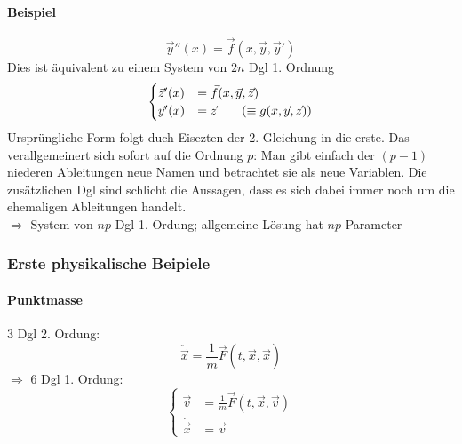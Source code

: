 \documentclass[a4paper]{scrartcl}
\newcommand{\f}[2]{\frac{#1}{#2}}
\renewcommand{\v}[1]{\vec{#1}}
\theoremstyle{definition}
\theoremstyle{plain}
\theoremstyle{remark}
\begin{document}
\paragraph{Beispiel}
\label{sec-3-3-8-2}
\[\v{y}''(x) = \v{f}(x,\v{y},\v{y}')\]
Dies ist äquivalent zu einem System von $2n$ Dgl 1. Ordnung
\begin{equation}
\begin{cases}
\v{z}'(x) &= \v{f}(x,\v{y},\v{z}) \\
\v{y}'(x) &= \v z \tag{$\equiv g(x,\v y, \v z)$}
\end{cases}
\end{equation}
Ursprüngliche Form folgt duch Eisezten der 2. Gleichung in die erste.
Das verallgemeinert sich sofort auf die Ordnung $p$: Man gibt einfach der $(p - 1)$ niederen Ableitungen neue Namen und betrachtet sie als neue Variablen. Die zusätzlichen Dgl sind schlicht die Aussagen, dass es sich dabei immer noch um die ehemaligen Ableitungen handelt. \\
     $\Rightarrow$ System von $n p$ Dgl 1. Ordung; allgemeine Lösung hat $n p$ Parameter
\subsubsection{Erste physikalische Beipiele}
\label{sec-3-3-9}
\paragraph{Punktmasse}
\label{sec-3-3-9-1}
3 Dgl 2. Ordung: \[\ddot{\v x} = \f{1}{m}\v F(t,\v x,\dot{\v x})\]
$\Rightarrow$ 6 Dgl 1. Ordung:
\begin{equation}
\begin{cases}
\dot{\v v} &= \f{1}{m}\v F(t,\v x,\v v) \\
\dot{\v x} &= \v v
\end{cases}
\end{equation}
\end{document}
